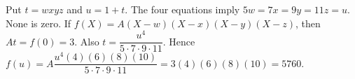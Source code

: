 Put $t=wxyz$ and $u=1+t$. The four equations imply $5w=7x=9y=11z=u$. None is zero. If $f(X)=A(X-w)(X-x)(X-y)(X-z)$, then $At=f(0)=3$. Also $t=\dfrac{u^4}{5\cdot7\cdot9\cdot11}$. Hence $f(u)=A\dfrac{u^4(4)(6)(8)(10)}{5\cdot7\cdot9\cdot11}=3(4)(6)(8)(10)=\boxed{5760}$.
